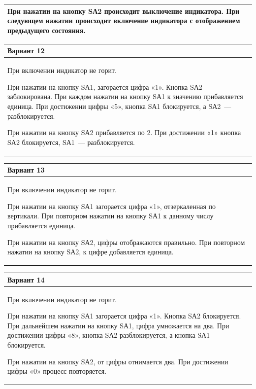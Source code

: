 \documentclass[main.tex]{subfiles}
\begin{document}
\begin{small}
\begin{tabularx}{\textwidth}{|X|}
При нажатии на кнопку SА2 происходит выключение индикатора. При следующем нажатии происходит включение индикатора с отображением предыдущего состояния.\\
\hline
\end{tabularx}

\vspace{6px}
\noindent 
\begin{tabularx}{\textwidth}{|X|}
\hline
\textbf{Вариант 12}\\
\hline
При включении индикатор не горит.

При нажатии на кнопку SА1, загорается цифра «1». Кнопка SА2 заблокирована. При каждом нажатии на кнопку SА1 к значению прибавляется единица. При достижении цифры «5», кнопка SА1 блокируется, а SА2~--- разблокируется.

При нажатии на кнопку SА2 прибавляется по 2. При достижении «1» кнопка SА2 блокируется, SА1~--- разблокируется.\\
\hline
\end{tabularx}

\vspace{6px}
\noindent 
\begin{tabularx}{\textwidth}{|X|}
\hline
\textbf{Вариант 13}\\
\hline
При включении индикатор не горит.

При нажатии на кнопку SА1 загорается цифра «1», отзеркаленная по вертикали. При повторном нажатии на кнопку SА1 к данному числу прибавляется единица.

При нажатии на кнопку SА2, цифры отображаются правильно. При повторном нажатии на кнопку SА2, к цифре добавляется еди­ница.\\
\hline
\end{tabularx}

\vspace{6px}
\noindent 
\begin{tabularx}{\textwidth}{|X|}
\hline
\textbf{Вариант 14}\\
\hline
При включении индикатор не горит.

При нажатии на кнопку SА1 загорается цифра «1». Кнопка SА2 блокируется. При дальнейшем нажатии на кнопку SА1, цифра умножается на два. При достижении цифры «8», кнопка SА2 раз­блокируется, а кнопка SА1~--- блокируется.

При нажатии на кнопку SА2, от цифры отнимается два. При достижении цифры «0» про­цесс повторяется.\\
\hline
\end{tabularx}




\end{small}
\end{document}
